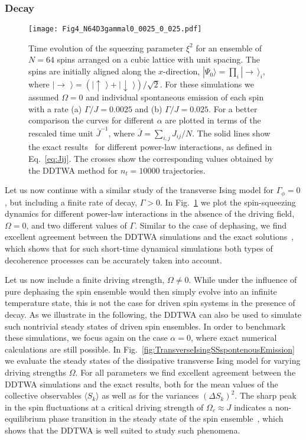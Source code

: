 \documentclass[pra,twocolumn,showpacs,preprintnumbers,amsmath,amssymb,superscriptaddress]{revtex4-1}
\newcommand{\ket}[1]{|#1\rangle}
\newcommand{\erw}[1]{\langle#1\rangle}
\begin{document}
\subsubsection{Decay}
%
\begin{figure}[t]
	\centering
	\texttt{[image: Fig4\_N64D3gammal0\_0025\_0\_025.pdf]}
	\caption{Time evolution of the squeezing parameter $\xi^2$ for an ensemble of $N=64$ spins arranged on a cubic lattice with unit spacing. The spins are initially aligned along the $x$-direction, $|\Psi_0\rangle=\prod_i |\rightarrow\,\rangle_i$, where $\ket{\rightarrow\,\,}=(\ket{\uparrow\,\,}+\ket{\downarrow\,\,})/\sqrt{2}$. For these simulations we assumed $\Omega=0$ and individual spontaneous emission of each spin with a rate (a) $\Gamma/J=0.0025$ and (b) $\Gamma/J=0.025$. 
		For a better comparison the curves for different $\alpha$ are plotted in terms of the rescaled time unit $\bar J^{-1}$, where $\bar J=\sum_{i,j}J_{ij}/N$. The solid lines show the exact results~\cite{FossFeig2013} for different power-law interactions, as defined in Eq.~\eqref{eq:Jij}. The crosses show the corresponding values obtained by the DDTWA method for $n_t=10000$ trajectories.}
	\label{fig:ZZEmissionAlpha}
\end{figure}
%
Let us now continue with a similar study of the transverse Ising model for $\Gamma_\phi=0$, but including a finite rate of decay, $\Gamma>0$. In Fig.~\ref{fig:ZZEmissionAlpha} we plot the spin-squeezing dynamics for different power-law interactions in the absence of the driving field, $\Omega=0$, and two different values of $\Gamma$. Similar to the case of dephasing, we find excellent agreement between the DDTWA simulations and the exact solutions~\cite{FossFeig2013}, which shows that for such short-time dynamical simulations both types of decoherence processes can be accurately taken into account. 

Let us now include a finite driving strength, $\Omega \neq 0$. While under the influence of pure dephasing the spin ensemble would then simply evolve into an infinite temperature state, this is not the case for driven spin systems in the presence of decay. As we illustrate in the following, the DDTWA can also be used to simulate such nontrivial steady states of driven spin ensembles. In order to benchmark these simulations, we focus again on the case $\alpha=0$, where exact numerical calculations are still possible. In Fig.~\ref{fig:TransverseIsingSSspontenousEmission} we evaluate the steady states of the dissipative transverse Ising model for varying driving strengths $\Omega$. For all parameters we  find excellent agreement between the DDTWA simulations and the exact results, both for the mean values of the collective observables $\erw{S_k}$ as well as for the variances $(\Delta S_k)^2$. The sharp peak in the spin fluctuations at a critical driving strength of $\Omega_c\approx J$ indicates a non-equilibrium phase transition in the steady state of the spin ensemble~\cite{Morrison2008}, which shows that the DDTWA is well suited to study such phenomena.  
\end{document}
